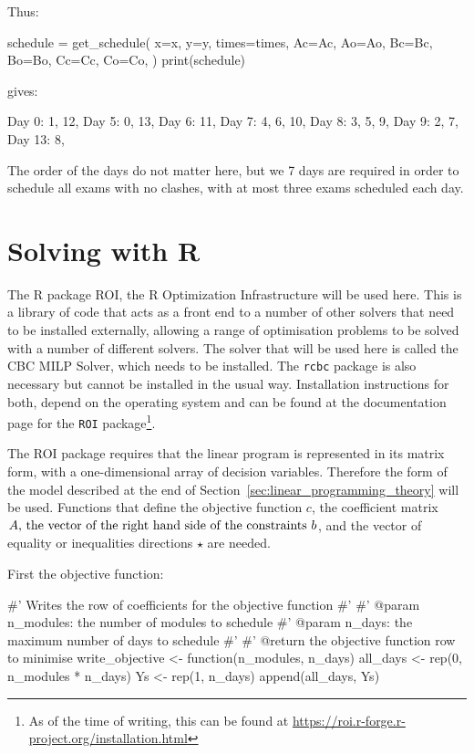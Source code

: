 Thus:

\begin{pyin}
schedule = get_schedule(
    x=x,
    y=y,
    times=times,
    Ac=Ac,
    Ao=Ao,
    Bc=Bc,
    Bo=Bo,
    Cc=Cc,
    Co=Co,
)
print(schedule)
\end{pyin}

gives:

\begin{pyout}

Day 0: 1, 12, 
Day 5: 0, 13, 
Day 6: 11, 
Day 7: 4, 6, 10, 
Day 8: 3, 5, 9, 
Day 9: 2, 7, 
Day 13: 8,
\end{pyout}

The order of the days do not matter here, but we 7 days are required in order to
schedule all exams with no clashes, with at most three exams scheduled each day.

\section{Solving with R}\label{sec:linear_programming_solving-with-R}

The R package ROI, the R Optimization
Infrastructure will be used here.
This is a library of code that acts as a front end to a number of other solvers
that need to be installed externally, allowing a range of optimisation problems
to be solved with a number of different solvers.
The solver that will be used here is called the CBC MILP Solver, which needs to
be installed. The \texttt{rcbc} package is also necessary but cannot be
installed in the usual way. Installation instructions for both, depend on the
operating system and can
be found at the documentation page for the \texttt{ROI}
package\footnote{As of the time of writing, this can be found at
\url{https://roi.r-forge.r-project.org/installation.html}}.

The ROI package requires that the linear program is
represented in its matrix form, with a one-dimensional array of decision
variables. Therefore the form of the model described at the end of
Section~\ref{sec:linear_programming_theory} will be used.
Functions that define the objective function \(c\), the coefficient
matrix \(A$, the vector of the right hand side of the constraints $b\), and the
vector of equality or inequalities directions \(\star\) are needed.

First the objective function:

\begin{Rin-no-test}
#' Writes the row of coefficients for the objective function
#'
#' @param n_modules: the number of modules to schedule
#' @param n_days: the maximum number of days to schedule
#'
#' @return the objective function row to minimise
write_objective <- function(n_modules, n_days){
  all_days <- rep(0, n_modules * n_days)
  Ys <- rep(1, n_days)
  append(all_days, Ys)
}
\end{Rin-no-test}

